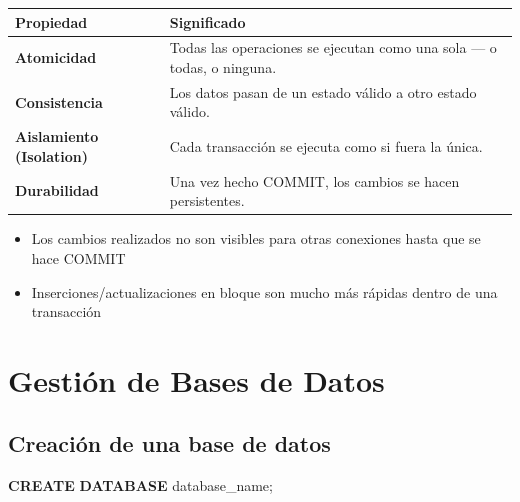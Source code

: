 \documentclass[
]{book}
\newenvironment{Shaded}{\begin{snugshade}}{\end{snugshade}}
\newcommand{\KeywordTok}[1]{\textcolor[rgb]{0.13,0.29,0.53}{\textbf{#1}}}
\newcommand{\NormalTok}[1]{#1}
\newcounter{none} %
\theoremstyle{break}
\theoremstyle{nonumberplain}
\begin{document}
{\def\LTcaptype{none} %
\begin{longtable}[]{@{}
  >{\raggedright\arraybackslash}p{}
  >{\raggedright\arraybackslash}p{}@{}}
\toprule\noalign{}
\begin{minipage}[b]{\linewidth}\raggedright
Propiedad
\end{minipage} & \begin{minipage}[b]{\linewidth}\raggedright
Significado
\end{minipage} \\
\midrule\noalign{}
\endhead
\bottomrule\noalign{}
\endlastfoot
\textbf{Atomicidad} & Todas las operaciones se ejecutan como una sola --- o todas, o ninguna. \\
\textbf{Consistencia} & Los datos pasan de un estado válido a otro estado válido. \\
\textbf{Aislamiento (Isolation)} & Cada transacción se ejecuta como si fuera la única. \\
\textbf{Durabilidad} & Una vez hecho COMMIT, los cambios se hacen persistentes. \\
\end{longtable}
}

\begin{itemize}
\item
  Los cambios realizados no son visibles para otras conexiones hasta que se hace COMMIT
\item
  Inserciones/actualizaciones en bloque son mucho más rápidas dentro de una transacción
\end{itemize}

\section{Gestión de Bases de Datos}\label{gestiuxf3n-de-bases-de-datos}

\subsection{Creación de una base de datos}\label{creaciuxf3n-de-una-base-de-datos}

\begin{Shaded}
\begin{Highlighting}[]
\KeywordTok{CREATE} \KeywordTok{DATABASE}\NormalTok{ database\_name;}
\end{Highlighting}
\end{Shaded}
\end{document}
